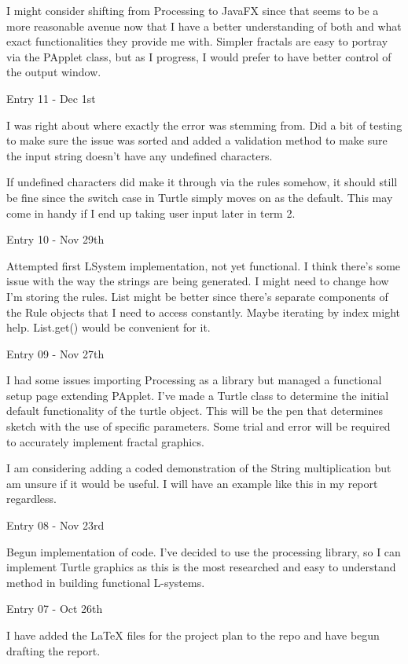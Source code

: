 \documentclass[]{interim_report}
\begin{document}
I might consider shifting from Processing to JavaFX since that seems to be a more reasonable avenue now that I have a better understanding of both and what exact functionalities they provide me with. Simpler fractals are easy to portray via the PApplet class, but as I progress, I would prefer to have better control of the output window.

Entry 11 - Dec 1st

I was right about where exactly the error was stemming from. Did a bit of testing to make sure the issue was sorted and added a validation method to make sure the input string doesn't have any undefined characters.

If undefined characters did make it through via the rules somehow, it should still be fine since the switch case in Turtle simply moves on as the default. This may come in handy if I end up taking user input later in term 2.

Entry 10 - Nov 29th

Attempted first LSystem implementation, not yet functional. I think there's some issue with the way the strings are being generated. I might need to change how I'm storing the rules. List might be better since there's separate components of the Rule objects that I need to access constantly. Maybe iterating by index might help. List.get() would be convenient for it.

Entry 09 - Nov 27th

I had some issues importing Processing as a library but managed a functional setup page extending PApplet. I've made a Turtle class to determine the initial default functionality of the turtle object. This will be the pen that determines sketch with the use of specific parameters. Some trial and error will be required to accurately implement fractal graphics.

I am considering adding a coded demonstration of the String multiplication but am unsure if it would be useful. I will have an example like this in my report regardless.

Entry 08 - Nov 23rd

Begun implementation of code. I've decided to use the processing library, so I can implement Turtle graphics as this is the most researched and easy to understand method in building functional L-systems.

Entry 07 - Oct 26th

I have added the LaTeX files for the project plan to the repo and have begun drafting the report.
\end{document}
